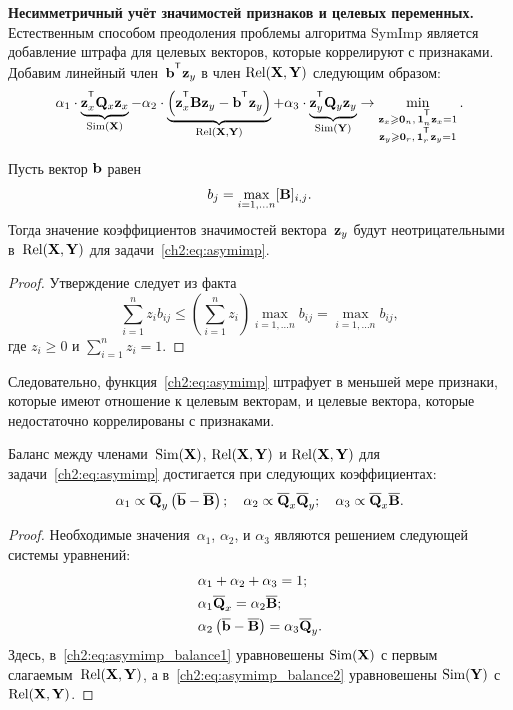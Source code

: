 \textbf{Несимметричный учёт значимостей признаков и целевых переменных.}
Естественным способом преодоления проблемы алгоритма SymImp является добавление штрафа для целевых векторов, которые коррелируют с признаками.
Добавим линейный член~$\bb^{\T} \bz_y$ в член $\text{Rel}(\mathbf{X}, \mathbf{Y})$ следующим образом:
\begin{equation}
\alpha_1 \cdot \underbrace{\bz_x^{\T} \bQ_x \bz_x}_{\text{Sim}(\bX)} - \alpha_2 \cdot  \underbrace{\left(\bz_x^{\T} \bB \bz_y - \bb^{\T} \bz_y \right) }_{\text{Rel}(\bX, \bY)} + \alpha_3 \cdot \underbrace{\bz_y^{\T} \bQ_y \bz_y}_{\text{Sim}(\bY)} \rightarrow \min_{\substack{\bz_x \geq \bZero_n, \, \bOne_n^{\T}\bz_x=1 \\ \bz_y \geq \bZero_r, \, \bOne_r^{\T}\bz_y=1}}.
\label{ch2:eq:asymimp}
\end{equation}
\begin{statement}
	Пусть вектор $\mathbf{b}$ равен
	\begin{equation*}
	b_j = \max_{i=1, \dots n} [\mathbf{B}]_{i, j}.
	\end{equation*}
	Тогда значение коэффициентов значимостей вектора~$\mathbf{z}_y$ будут неотрицательными в~$\text{Rel}(\mathbf{X}, \mathbf{Y})$ для задачи~\eqref{ch2:eq:asymimp}.
\end{statement}
\begin{proof}
	Утверждение следует из факта
	\[
	\sum_{i=1}^n  z_i b_{ij} \leq \left(\sum_{i=1}^n z_i \right)\max_{i=1, \dots n} b_{ij} = \max_{i=1, \dots n} b_{ij},
	\]
	где $z_i \geq 0$ и $\sum_{i=1}^n z_i = 1$.
\end{proof}
Следовательно, функция~\eqref{ch2:eq:asymimp} штрафует в меньшей мере признаки, которые имеют отношение к целевым векторам, и целевые вектора, которые недостаточно коррелированы с признаками.
\begin{statement}
	Баланс между членами~$\text{Sim}(\mathbf{X})$, $\text{Rel}(\mathbf{X}, \mathbf{Y})$ и $\text{Rel}(\mathbf{X}, \mathbf{Y})$ для задачи~\eqref{ch2:eq:asymimp} достигается при следующих коэффициентах:
	\begin{equation*}
	\alpha_1 \propto \overline{\mathbf{Q}}_y \left( \overline{\mathbf{b}} - \overline{\mathbf{B}}\right); \quad
	\alpha_2 \propto \overline{\mathbf{Q}}_x \overline{\mathbf{Q}}_y; \quad
	\alpha_3  \propto \overline{\mathbf{Q}}_x \overline{\mathbf{B}}.
	\end{equation*}
\end{statement}
\begin{proof}
	Необходимые значения~$\alpha_1$, $\alpha_2$, и $\alpha_3$ являются решением следующей системы уравнений:
	\begin{align}
	&\alpha_1 + \alpha_2 + \alpha_3 = 1; \\
	&\alpha_1 \overline{\mathbf{Q}}_x = \alpha_2 \overline{\mathbf{B}}; \label{ch2:eq:asymimp_balance1}\\
	&\alpha_2 \left(\overline{\mathbf{b}} - \overline{\mathbf{B}} \right) = \alpha_3 \overline{\mathbf{Q}}_y.
	\label{ch2:eq:asymimp_balance2}
	\end{align}
	Здесь, в~\eqref{ch2:eq:asymimp_balance1} уравновешены $\text{Sim}(\mathbf{X})$ с первым слагаемым~$\text{Rel}(\mathbf{X}, \mathbf{Y})$, а в~\eqref{ch2:eq:asymimp_balance2} уравновешены $\text{Sim}(\mathbf{Y})$  с~$\text{Rel}(\mathbf{X}, \mathbf{Y})$.
\end{proof}
